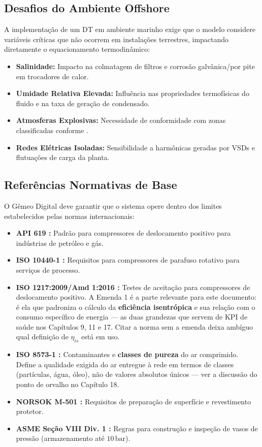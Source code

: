 \documentclass[12pt,a4paper]{article}
\numberwithin{equation}{section}
\numberwithin{table}{section}
\numberwithin{figure}{section}
\begin{document}
{	\subsection{\textbf{Desafios do Ambiente Offshore}}
	A implementação de um DT em ambiente marinho exige que o modelo considere variáveis críticas que não ocorrem em instalações terrestres, impactando diretamente o equacionamento termodinâmico:
	
	\begin{itemize}
		\item \textbf{Salinidade:} Impacto na colmatagem de filtros e corrosão galvânica/por pite em trocadores de calor.
		\item \textbf{Umidade Relativa Elevada:} Influência nas propriedades termofísicas do fluido e na taxa de geração de condensado.
		\item \textbf{Atmosferas Explosivas:} Necessidade de conformidade com zonas classificadas conforme  \cite{iec60079}.
		\item \textbf{Redes Elétricas Isoladas:} Sensibilidade a harmônicas geradas por VSDs e flutuações de carga da planta.
	\end{itemize}
	
	\subsection{\textbf{Referências Normativas de Base}}
	O Gêmeo Digital deve garantir que o sistema opere dentro dos limites estabelecidos pelas normas internacionais:
	
	\begin{itemize}
		\item \textbf{API 619 \cite{api619}:} Padrão para compressores de deslocamento positivo para indústrias de petróleo e gás.
		\item \textbf{ISO 10440-1 \cite{iso10440}:} Requisitos para compressores de parafuso rotativo para serviços de processo.
		\item \textbf{ISO 1217:2009/Amd 1:2016 \cite{iso1217}:} Testes de aceitação para compressores de deslocamento positivo. A Emenda 1 é a parte relevante para este documento: é ela que padroniza o cálculo da \textbf{eficiência isentrópica} e sua relação com o consumo específico de energia — as duas grandezas que servem de KPI de saúde nos Capítulos 9, 11 e 17. Citar a norma sem a emenda deixa ambíguo qual definição de $\eta_{is}$ está em uso.
		\item \textbf{ISO 8573-1 \cite{iso8573}:} Contaminantes e \textbf{classes de pureza} do ar comprimido. Define a qualidade exigida do ar entregue à rede em termos de classes (partículas, água, óleo), não de valores absolutos únicos — ver a discussão do ponto de orvalho no Capítulo 18.
		\item \textbf{NORSOK M-501 \cite{norsok}:} Requisitos de preparação de superfície e revestimento protetor.
		\item \textbf{ASME Seção VIII Div. 1 \cite{asme8}:} Regras para construção e inspeção de vasos de pressão (armazenamento até $10\,\text{bar}$).
	\end{itemize}

}
\end{document}
